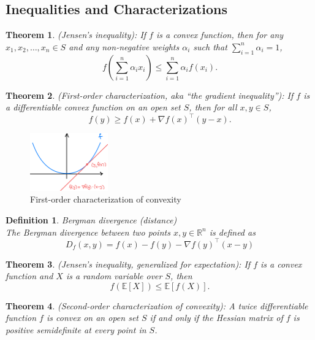 \documentclass[11pt]{book} %
\newtheorem{theorem}{Theorem}[section]
\newtheorem{definition}{Definition}[section]
\begin{document}
\subsection{Inequalities and Characterizations}

\begin{theorem}(Jensen's inequality): If $f$ is a convex function, then for any $x_1, x_2, \ldots, x_n \in S$ and any non-negative weights $\alpha_i$ such that $\sum_{i=1}^n \alpha_i = 1$,
\[ f\left(\sum_{i=1}^n \alpha_i x_i\right) \leq \sum_{i=1}^n \alpha_i f(x_i). \]
\end{theorem}


\begin{theorem}(First-order characterization, aka “the gradient inequality”): If $f$ is a differentiable convex function on an open set $S$, then for all $x, y \in S$,
\[ f(y) \geq f(x) + \nabla f(x)^\top (y - x). \]
\end{theorem}

\begin{figure}[H]
    \centering
    \includegraphics[width=0.3\textwidth]{Figs/first_order_characterization_of_convexity.png}
    \caption{First-order characterization of convexity}
\end{figure}

\begin{definition}{Bergman divergence (distance)} \\
The Bergman divergence between two points $x, y \in \mathbb{R}^n$ is defined as
\begin{equation}
    D_f(x,y) = f(x) - f(y) - \nabla f(y)^\top (x-y)
\end{equation}
\end{definition}


\begin{theorem} (Jensen’s inequality, generalized for expectation): If $f$ is a convex function and $X$ is a random variable over $S$, then
\[ f(\mathbb{E}[X]) \leq \mathbb{E}[f(X)]. \]
\end{theorem}


\begin{theorem} (Second-order characterization of convexity): A twice differentiable function $f$ is convex on an open set $S$ if and only if the Hessian matrix of $f$ is positive semidefinite at every point in $S$.
\end{theorem}
\end{document}
